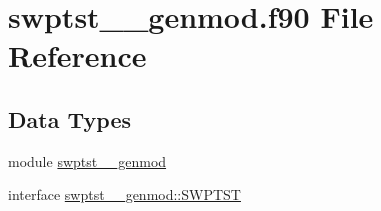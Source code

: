 \hypertarget{swptst____genmod_8f90}{\section{swptst\+\_\+\+\_\+genmod.\+f90 File Reference}
\label{swptst____genmod_8f90}
}
\subsection*{Data Types}
\begin{DoxyCompactItemize}
\item 
module \hyperlink{classswptst____genmod}{swptst\+\_\+\+\_\+genmod}
\item 
interface \hyperlink{interfaceswptst____genmod_1_1SWPTST}{swptst\+\_\+\+\_\+genmod\+::\+S\+W\+P\+T\+S\+T}
\end{DoxyCompactItemize}
